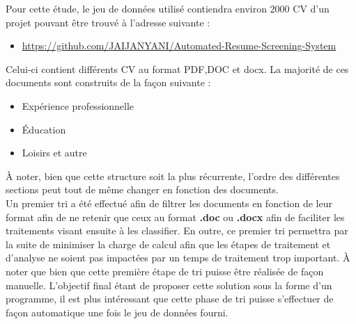 \documentclass[memoire.tex]{subfiles}
\begin{document}
Pour cette étude, le jeu de données utilisé contiendra environ 2000 CV  d'un projet pouvant être trouvé à l'adresse suivante : \begin{itemize}
\item \url{https://github.com/JAIJANYANI/Automated-Resume-Screening-System}
\end{itemize}
Celui-ci contient différents CV au format PDF,DOC et docx. La majorité de ces documents sont construits de la façon suivante : \begin{itemize}
\item Expérience professionnelle
\item Éducation
\item Loisirs et autre
\end{itemize}
À noter, bien que cette structure soit la plus récurrente, l'ordre des différentes sections peut tout de même changer en fonction des documents.\\
Un premier tri a été effectué afin de filtrer les documents en fonction de leur format afin de ne retenir que ceux au format \textbf{.doc} ou \textbf{.docx} afin de faciliter les traitements visant ensuite à les classifier. En outre, ce premier tri permettra par la suite de minimiser la charge de calcul afin que les étapes de traitement et d'analyse ne soient pas impactées par un temps de traitement trop important. À noter que bien que cette première étape de tri puisse être réalisée de façon manuelle. L'objectif final étant de proposer cette solution sous la forme d'un programme, il est plus intéressant que cette phase de tri puisse s'effectuer de façon automatique une fois le jeu de données fourni.
\end{document}

